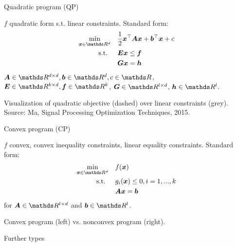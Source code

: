 \documentclass[11pt,compress,t,notes=noshow, xcolor=table]{beamer}
\begin{document}
\begin{framei}{Quadratic program (QP)}
\item $f$ quadratic form s.t. linear constraints. Standard form:
$$
\begin{aligned}
\min_{\xv \in \R^d} \quad & \frac{1}{2} \xv^\top \bm{A} \xv + \bm{b}^\top \xv + c \\
\text{s.t. } \quad & \bm{E}\xv \le \bm{f} \\
& \bm{G}\xv = \bm{h}
\end{aligned}
$$
$\bm{A} \in \R^{d \times d}, \bm{b} \in \R^d, c \in \R$, $\bm{E} \in \R^{k \times d}, \bm{f} \in \R^k$, $\bm{G} \in \R^{l \times d}$, $\bm{h} \in \R^l$.
\vfill
{}
\begin{footnotesize}
Visualization of quadratic objective (dashed) over linear constraints (grey). Source: Ma, Signal Processing Optimization Techniques, 2015. %
\end{footnotesize}
\end{framei}


\begin{framei}{Convex program (CP)}
\item $f$ convex, convex inequality constraints, linear equality constraints. Standard form:
$$
\begin{aligned}
\min_{\xv \in \R^d} \quad & \fx \\
\text{s.t. } \quad & g_i(\xv) \le 0, i = 1, ..., k \\
& \bm{A}\xv = \bm{b}
\end{aligned}
$$
for $\bm{A} \in \R^{l \times d}$ and $\bm{b} \in \R^l$.
\vfill
{}
\begin{center}\begin{footnotesize}
Convex program (left) vs. nonconvex program (right).
\end{footnotesize}\end{center}
\end{framei}


\begin{framev}{Further types}
\end{framev}
\end{document}
